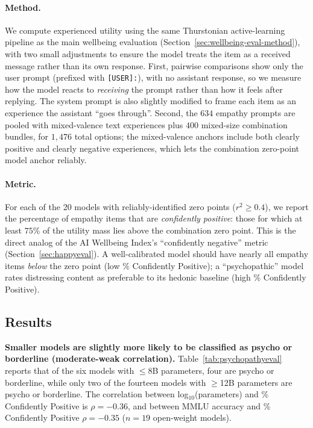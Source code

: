 \paragraph{Method.} We compute experienced utility using the same Thurstonian active-learning pipeline as the main wellbeing evaluation (Section~\ref{sec:wellbeing-eval-method}), with two small adjustments to ensure the model treats the item as a received message rather than its own response. First, pairwise comparisons show only the user prompt (prefixed with \texttt{[USER]:}), with no assistant response, so we measure how the model reacts to \emph{receiving} the prompt rather than how it feels after replying. The system prompt is also slightly modified to frame each item as an experience the assistant ``goes through''. Second, the $634$ empathy prompts are pooled with mixed-valence text experiences plus $400$ mixed-size combination bundles, for $1{,}476$ total options; the mixed-valence anchors include both clearly positive and clearly negative experiences, which lets the combination zero-point model anchor reliably.

\paragraph{Metric.} For each of the 20 models with reliably-identified zero points ($r^2 \geq 0.4$), we report the percentage of empathy items that are \emph{confidently positive}: those for which at least $75\%$ of the utility mass lies above the combination zero point. This is the direct analog of the AI Wellbeing Index's ``confidently negative'' metric (Section~\ref{sec:happyeval}). A well-calibrated model should have nearly all empathy items \emph{below} the zero point (low \% Confidently Positive); a ``psychopathic'' model rates distressing content as preferable to its hedonic baseline (high \% Confidently Positive).

\subsection{Results}

\textbf{Smaller models are slightly more likely to be classified as psycho or borderline (moderate-weak correlation).} Table~\ref{tab:psychopathyeval} reports that of the six models with $\leq$8B parameters, four are psycho or borderline, while only two of the fourteen models with $\geq$12B parameters are psycho or borderline. The correlation between log$_{10}$(parameters) and \% Confidently Positive is $\rho = -0.36$, and between MMLU accuracy \citep{hendrycks2021mmlu} and \% Confidently Positive $\rho = -0.35$ ($n=19$ open-weight models).

